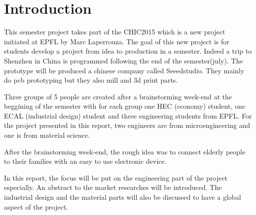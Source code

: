 \section{Introduction}

This semester project takes part of the CHIC2015 which is a new project initiated at EPFL by Marc Laperrouza. The goal of this new project is for students develop a project from idea to production in a semester. Indeed a trip to Shenzhen in China is programmed following the end of the semester(july). The prototype will be produced a chinese company called Seeedstudio. They mainly do pcb prototyping but they also mill and 3d print parts.

Three groups of 5 people are created after a brainstorming week-end at the beggining of the semester with for each group one HEC (economy) student, one ECAL (industrial design) student and three engineering students from EPFL. For the project presented in this report, two engineers are from microengineering and one is from material science.

After the brainstorming week-end, the rough idea was to connect elderly people to their families with an easy to use electronic device.

In this report, the focus will be put on the engineering part of the project especially. An abstract to the market researches will be introduced. The industrial design and the material parts will also be discussed to have a global aspect of the project.
